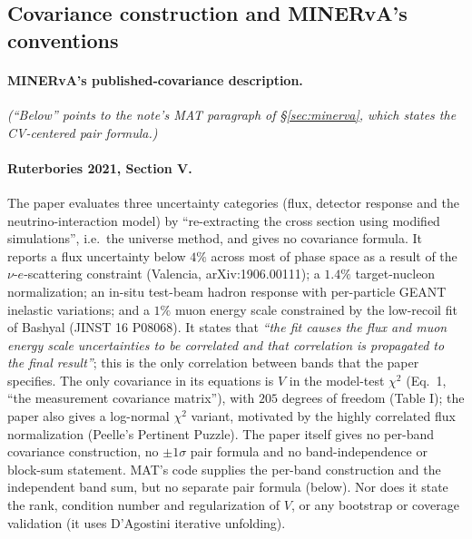 \subsection{Covariance construction and MINERvA's conventions}\label{recsec:methods-covariance}

\paragraph{MINERvA's published-covariance description.} \noindent\emph{(``Below'' points to the note's MAT paragraph of \S\ref{sec:minerva}, which states the CV-centered pair formula.)}

\paragraph{Ruterbories 2021, Section V.} The paper evaluates three uncertainty categories (flux, detector response and the neutrino-interaction model) by ``re-extracting the cross section using modified simulations'', i.e.\ the universe method, and gives no covariance formula. It reports a flux uncertainty below $4\%$ across most of phase space as a result of the $\nu$-$e$-scattering constraint (Valencia, arXiv:1906.00111); a $1.4\%$ target-nucleon normalization; an in-situ test-beam hadron response with per-particle GEANT inelastic variations; and a $1\%$ muon energy scale constrained by the low-recoil fit of Bashyal (JINST 16 P08068). It states that \emph{``the fit causes the flux and muon energy scale uncertainties to be correlated and that correlation is propagated to the final result''}; this is the only correlation between bands that the paper specifies. The only covariance in its equations is $V$ in the model-test $\chi^{2}$ (Eq.~1, ``the measurement covariance matrix''), with $205$ degrees of freedom (Table I); the paper also gives a log-normal $\chi^{2}$ variant, motivated by the highly correlated flux normalization (Peelle's Pertinent Puzzle). The paper itself gives no per-band covariance construction, no $\pm1\sigma$ pair formula and no band-independence or block-sum statement. MAT's code supplies the per-band construction and the independent band sum, but no separate pair formula (below). Nor does it state the rank, condition number and regularization of $V$, or any bootstrap or coverage validation (it uses D'Agostini iterative unfolding).

